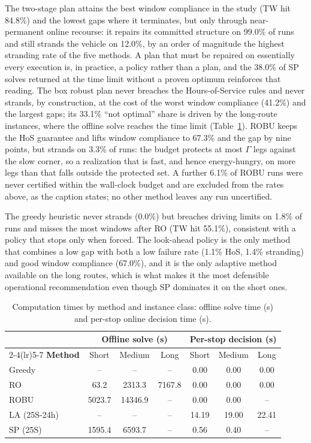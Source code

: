 The two-stage plan attains the best window compliance in the study (TW hit
84.8\%) and the lowest gaps where it terminates, but only through near-permanent
online recourse: it repairs its committed structure on 99.0\% of runs and still
strands the vehicle on 12.0\%, by an order of magnitude the highest stranding
rate of the five methods.  A plan that must be repaired on essentially every
execution is, in practice, a policy rather than a plan, and the 38.0\% of SP
solves returned at the time limit without a proven optimum reinforces that
reading.  The box robust plan never breaches the Hours-of-Service rules and
never strands, by construction, at the cost of the worst window compliance
(41.2\%) and the largest gaps; its 33.1\% ``not optimal'' share is driven by
the long-route instances, where the offline solve reaches the time limit
(Table~\ref{tab:runtime}).  ROBU keeps the HoS guarantee and lifts window
compliance to 67.3\% and the gap by nine points, but strands on 3.3\% of runs:
the budget protects at most $\Gamma$ legs against the slow corner, so a
realization that is fast, and hence energy-hungry, on more legs than that falls
outside the protected set.  A further 6.1\% of ROBU runs were never certified
within the wall-clock budget and are excluded from the rates above, as the
caption states; no other method leaves any run uncertified.

The greedy heuristic never strands (0.0\%) but breaches driving limits on 1.8\%
of runs and misses the most windows after RO (TW hit 55.1\%), consistent with a
policy that stops only when forced.  The look-ahead policy is the only method
that combines a low gap with both a low failure rate (1.1\% HoS, 1.4\%
stranding) and good window compliance (67.0\%), and it is the only adaptive
method available on the long routes, which is what makes it the most defensible
operational recommendation even though SP dominates it on the short ones.

\begin{table}[htbp]
\centering
\caption{Computation times by method and instance class: offline solve time (s) and per-stop online decision time (s).}
\label{tab:runtime}
\begin{tabular}{lcccccc}
\toprule
& \multicolumn{3}{c}{\textbf{Offline solve (s)}} & \multicolumn{3}{c}{\textbf{Per-stop decision (s)}}\\
\cmidrule(lr){2-4}\cmidrule(lr){5-7}
\textbf{Method} & Short & Medium & Long & Short & Medium & Long\\
\midrule
Greedy & -- & -- & -- & 0.00 & 0.00 & 0.00 \\
RO & 63.2 & 2313.3 & 7167.8 & 0.00 & 0.00 & 0.00 \\
ROBU & 5023.7 & 14346.9 & -- & 0.00 & 0.00 & -- \\
LA (25S-24h) & -- & -- & -- & 14.19 & 19.00 & 22.41 \\
SP (25S) & 1595.4 & 6593.7 & -- & 0.56 & 0.40 & -- \\
\bottomrule
\end{tabular}
\end{table}

